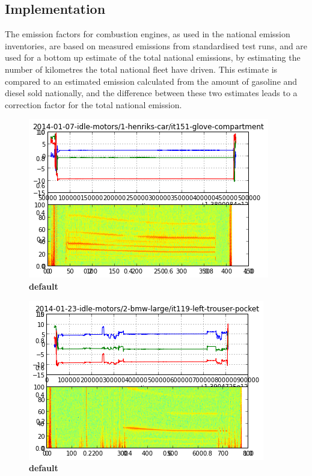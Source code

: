 \subsection {Implementation}
The emission factors for combustion engines, as used in the national emission inventories, are based on measured emissions from standardised test runs, and are used for a bottom up estimate of the total national emissions, by estimating the number of kilometres the total national fleet have driven. This estimate is compared to an estimated emission calculated from the amount of gasoline and diesel sold nationally, and the difference between these two estimates leads to a correction factor for the total national emission.
\begin{figure}[htbp]
\begin{center}
\includegraphics{idle_henrik.png}
\caption{{\bf default}}
\label{idle_henrik}
\end{center}
\end{figure}

\begin{figure}[htbp]
\begin{center}
\includegraphics{idle_BMW.png}
\caption{{\bf default}}
\label{idle_bmw}
\end{center}
\end{figure}

